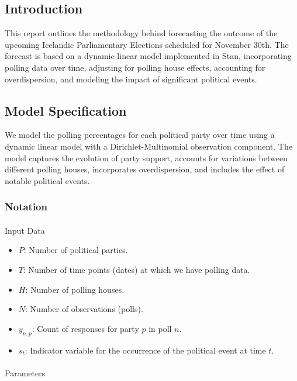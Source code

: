 \documentclass[
  letterpaper,
  DIV=11,
  numbers=noendperiod]{scrartcl}
\author{}
\date{}
\makeatletter
\let\oldparagraph\paragraph
\renewcommand{\paragraph}{
    \@ifstar
      \xxxParagraphStar
      \xxxParagraphNoStar
  }
\newcommand{\xxxParagraphStar}[1]{\oldparagraph*{#1}\mbox{}}
\newcommand{\xxxParagraphNoStar}[1]{\oldparagraph{#1}\mbox{}}
\providecommand{\tightlist}{%
  \setlength{\itemsep}{0pt}\setlength{\parskip}{0pt}}\usepackage{longtable,booktabs,array}
\makeatother
\begin{document}
\subsection{Introduction}\label{introduction}

This report outlines the methodology behind forecasting the outcome of
the upcoming Icelandic Parliamentary Elections scheduled for November
30th. The forecast is based on a dynamic linear model implemented in
Stan, incorporating polling data over time, adjusting for polling house
effects, accounting for overdispersion, and modeling the impact of
significant political events.

\subsection{Model Specification}\label{model-specification}

We model the polling percentages for each political party over time
using a dynamic linear model with a Dirichlet-Multinomial observation
component. The model captures the evolution of party support, accounts
for variations between different polling houses, incorporates
overdispersion, and includes the effect of notable political events.

\subsubsection{Notation}\label{notation}

\paragraph{Input Data}\label{input-data}

\begin{itemize}
\tightlist
\item
  \(P\): Number of political parties.
\item
  \(T\): Number of time points (dates) at which we have polling data.
\item
  \(H\): Number of polling houses.
\item
  \(N\): Number of observations (polls).
\item
  \(y_{n,p}\): Count of responses for party \(p\) in poll \(n\).
\item
  \(s_t\): Indicator variable for the occurrence of the political event
  at time \(t\).
\end{itemize}

\paragraph{Parameters}\label{parameters}
\end{document}
